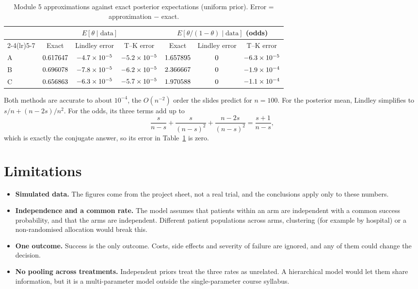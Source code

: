 \documentclass[11pt,a4paper]{article}
\begin{document}
\begin{table}[H]
\centering\small
\caption{Module 5 approximations against exact posterior expectations (uniform prior). Error =
approximation $-$ exact.}\label{tab:m5}
\begin{tabular}{lcccccc}
\toprule
 & \multicolumn{3}{c}{$E[\theta\mid\text{data}]$} & \multicolumn{3}{c}{$E[\theta/(1-\theta)\mid\text{data}]$ (odds)}\\
\cmidrule(lr){2-4}\cmidrule(lr){5-7}
 & Exact & Lindley error & T--K error & Exact & Lindley error & T--K error\\
\midrule
A & $0.617647$ & $-4.7\times 10^{-5}$ & $-5.2\times 10^{-5}$ & $1.657895$ & $0$ & $-6.3\times 10^{-5}$\\
B & $0.696078$ & $-7.8\times 10^{-5}$ & $-6.2\times 10^{-5}$ & $2.366667$ & $0$ & $-1.9\times 10^{-4}$\\
C & $0.656863$ & $-6.3\times 10^{-5}$ & $-5.7\times 10^{-5}$ & $1.970588$ & $0$ & $-1.1\times 10^{-4}$\\
\bottomrule
\end{tabular}
\end{table}

Both methods are accurate to about $10^{-4}$, the $O(n^{-2})$ order the slides predict for $n=100$.
For the posterior mean, Lindley simplifies to $s/n+(n-2s)/n^2$. For the odds, its three terms add up to
\[
\frac{s}{n-s}+\frac{s}{(n-s)^2}+\frac{n-2s}{(n-s)^2}=\frac{s+1}{n-s},
\]
which is exactly the conjugate answer, so its error in Table~\ref{tab:m5} is zero.

\section{Limitations}

\begin{itemize}
\item \textbf{Simulated data.} The figures come from the project sheet, not a real trial, and the
conclusions apply only to these numbers.
\item \textbf{Independence and a common rate.} The model assumes that patients within an arm are
independent with a common success probability, and that the arms are independent. Different patient
populations across arms, clustering (for example by hospital) or a non-randomised allocation would
break this.
\item \textbf{One outcome.} Success is the only outcome. Costs, side effects and severity of failure
are ignored, and any of them could change the decision.
\item \textbf{No pooling across treatments.} Independent priors treat the three rates as unrelated.
A hierarchical model would let them share information, but it is a multi-parameter model outside the
single-parameter course syllabus.
\end{itemize}
\end{document}
